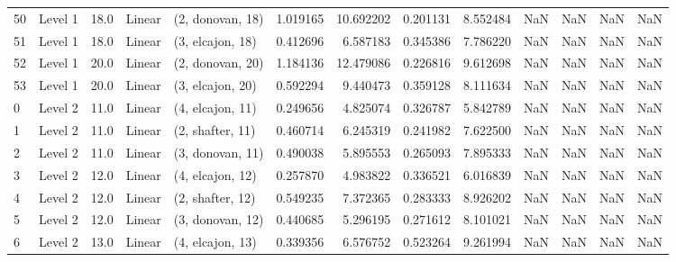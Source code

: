 \begin{tabular}{llrllrrrrrrrr}
50 &   Level 1 &   18.0 &      Linear &  (2, donovan, 18) &   1.019165 &  10.692202 &  0.201131 &   8.552484 &                  NaN &                    NaN &                 NaN &                   NaN \\
51 &   Level 1 &   18.0 &      Linear &  (3, elcajon, 18) &   0.412696 &   6.587183 &  0.345386 &   7.786220 &                  NaN &                    NaN &                 NaN &                   NaN \\
52 &   Level 1 &   20.0 &      Linear &  (2, donovan, 20) &   1.184136 &  12.479086 &  0.226816 &   9.612698 &                  NaN &                    NaN &                 NaN &                   NaN \\
53 &   Level 1 &   20.0 &      Linear &  (3, elcajon, 20) &   0.592294 &   9.440473 &  0.359128 &   8.111634 &                  NaN &                    NaN &                 NaN &                   NaN \\
0  &   Level 2 &   11.0 &      Linear &  (4, elcajon, 11) &   0.249656 &   4.825074 &  0.326787 &   5.842789 &                  NaN &                    NaN &                 NaN &                   NaN \\
1  &   Level 2 &   11.0 &      Linear &  (2, shafter, 11) &   0.460714 &   6.245319 &  0.241982 &   7.622500 &                  NaN &                    NaN &                 NaN &                   NaN \\
2  &   Level 2 &   11.0 &      Linear &  (3, donovan, 11) &   0.490038 &   5.895553 &  0.265093 &   7.895333 &                  NaN &                    NaN &                 NaN &                   NaN \\
3  &   Level 2 &   12.0 &      Linear &  (4, elcajon, 12) &   0.257870 &   4.983822 &  0.336521 &   6.016839 &                  NaN &                    NaN &                 NaN &                   NaN \\
4  &   Level 2 &   12.0 &      Linear &  (2, shafter, 12) &   0.549235 &   7.372365 &  0.283333 &   8.926202 &                  NaN &                    NaN &                 NaN &                   NaN \\
5  &   Level 2 &   12.0 &      Linear &  (3, donovan, 12) &   0.440685 &   5.296195 &  0.271612 &   8.101021 &                  NaN &                    NaN &                 NaN &                   NaN \\
6  &   Level 2 &   13.0 &      Linear &  (4, elcajon, 13) &   0.339356 &   6.576752 &  0.523264 &   9.261994 &                  NaN &                    NaN &                 NaN &                   NaN \\

\end{tabular}
